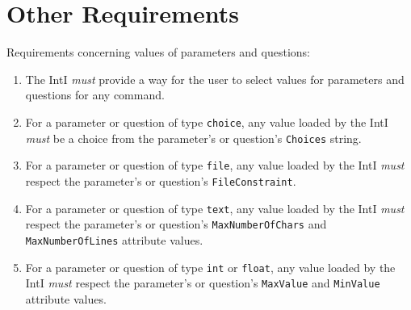 \documentclass[11pt]{article}
\newcommand{\must}{{\it must}}
\newcounter{coreReq}
\begin{document}
\section{Other Requirements}

\noindent Requirements concerning values of parameters and questions:
\begin{enumerate}
\setcounter{enumi}{\value{coreReq}}

\item The IntI {\must} provide a way for the user to select values for
  parameters and questions for any command.

\item For a parameter or question of type {\tt choice}, any value loaded
  by the IntI {\must} be a choice from the parameter's or question's
  {\tt Choices} string.

\item For a parameter or question of type {\tt file}, any value loaded by
  the IntI {\must} respect the parameter's or question's {\tt FileConstraint}.

\item For a parameter or question of type {\tt text}, any value loaded by
  the IntI {\must} respect the parameter's or question's
  {\tt MaxNumberOfChars} and {\tt MaxNumberOfLines} attribute values.

\item For a parameter or question of type {\tt int} or {\tt float}, any
  value loaded by the IntI {\must} respect the parameter's or question's
  {\tt MaxValue} and {\tt MinValue} attribute values.

\setcounter{coreReq}{\value{enumi}}
\end{enumerate}
\end{document}
